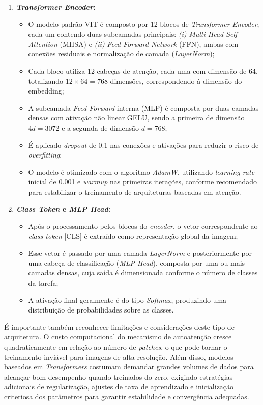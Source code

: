 \begin{enumerate}
    \item \textbf{\textit{Transformer Encoder}:}
    \begin{itemize}
        \item O modelo padrão \acs{VIT} é composto por 12 blocos de \textit{Transformer Encoder}, cada um contendo duas subcamadas principais: 
        \textit{(i)} \textit{Multi-Head Self-Attention} (\acs{MHSA}) e 
        \textit{(ii)} \textit{Feed-Forward Network} (\acs{FFN}), ambas com conexões residuais e normalização de camada (\textit{LayerNorm});
        \item Cada bloco utiliza 12 cabeças de atenção, cada uma com dimensão de 64, totalizando $12\times64 = 768$ dimensões, correspondendo à dimensão do embedding;
        \item A subcamada \textit{Feed-Forward} interna (\acs{MLP}) é composta por duas camadas densas com ativação não linear \acs{GELU}, sendo a primeira de dimensão $4d = 3072$ e a segunda de dimensão $d = 768$;
        \item É aplicado \textit{dropout} de 0.1 nas conexões e ativações para reduzir o risco de \textit{overfitting};
        \item O modelo é otimizado com o algoritmo \textit{AdamW}, utilizando \textit{learning rate} inicial de 0.001 e \textit{warmup} nas primeiras iterações, conforme recomendado para estabilizar o treinamento de arquiteturas baseadas em atenção.
    \end{itemize}

    \item \textbf{\textit{Class Token} e \textit{\acs{MLP} Head}:}
    \begin{itemize}
        \item Após o processamento pelos blocos do \textit{encoder}, o vetor correspondente ao \textit{class token} [CLS] é extraído como representação global da imagem;
        \item Esse vetor é passado por uma camada \textit{LayerNorm} e posteriormente por uma cabeça de classificação (\textit{\acs{MLP} Head}), composta por uma ou mais camadas densas, cuja saída é dimensionada conforme o número de classes da tarefa;
        \item A ativação final geralmente é do tipo \textit{Softmax}, produzindo uma distribuição de probabilidades sobre as classes.
    \end{itemize}

\end{enumerate}

É importante também reconhecer limitações e considerações deste tipo de arquitetura. O custo computacional do mecanismo de autoatenção cresce quadraticamente em relação ao número de \textit{patches}, o que pode tornar o treinamento inviável para imagens de alta resolução. Além disso, modelos baseados em \textit{Transformers} costumam demandar grandes volumes de dados para alcançar bom desempenho quando treinados do zero, exigindo estratégias adicionais de regularização, ajustes de taxa de aprendizado e inicialização criteriosa dos parâmetros para garantir estabilidade e convergência adequadas.

